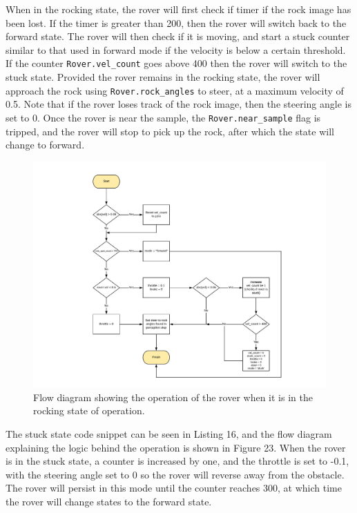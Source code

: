 \documentclass[a4paper]{article}
\begin{document}
When in the rocking state, the rover will first check if timer if the rock image has been lost. If the timer is greater than 200, then the rover will switch back to the forward state. The rover will then check if it is moving, and start a stuck counter similar to that used in forward mode if the velocity is below a certain threshold. If the counter \verb|Rover.vel_count| goes above 400 then the rover will switch to the stuck state. Provided the rover remains in the rocking state, the rover will approach the rock using \verb|Rover.rock_angles| to steer, at a maximum velocity of 0.5. Note that if the rover loses track of the rock image, then the steering angle is set to 0. Once the rover is near the sample, the \verb|Rover.near_sample| flag is tripped, and the rover will stop to pick up the rock, after which the state will change to forward.\\

\begin{figure}[h]
\hspace{-2.5cm}
\includegraphics[scale=0.7]{rocking_flow}
\caption{Flow diagram showing the operation of the rover when it is in the rocking state of operation.}
\end{figure}

The stuck state code snippet can be seen in Listing 16, and the flow diagram explaining the logic behind the operation is shown in Figure 23. When the rover is in the stuck state, a counter is increased by one, and the throttle is set to -0.1, with the steering angle set to 0 so the rover will reverse away from the obstacle. The rover will persist in this mode until the counter reaches 300, at which time the rover will change states to the forward state.\\
\end{document}

